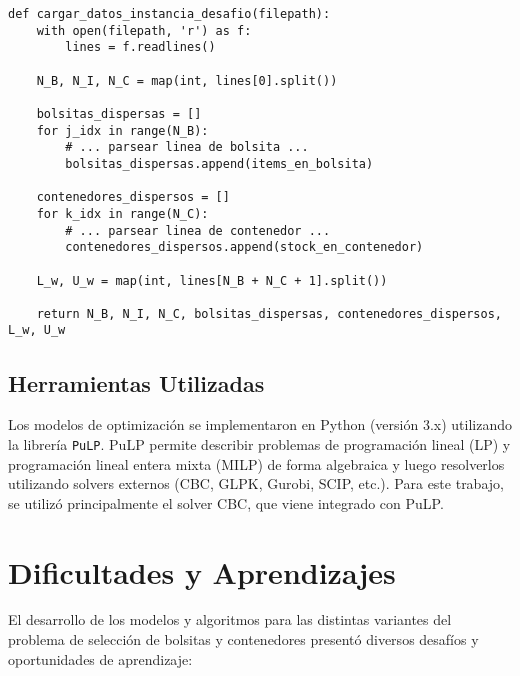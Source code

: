\documentclass[a4paper,12pt]{article}
\begin{document}
\begin{lstlisting}[caption={Función de carga de datos en leer\_archivo.py (Conceptual)}, label={lst:leer_archivo}]
def cargar_datos_instancia_desafio(filepath):
    with open(filepath, 'r') as f:
        lines = f.readlines()
    
    N_B, N_I, N_C = map(int, lines[0].split())
    
    bolsitas_dispersas = []
    for j_idx in range(N_B):
        # ... parsear linea de bolsita ...
        bolsitas_dispersas.append(items_en_bolsita)
        
    contenedores_dispersos = []
    for k_idx in range(N_C):
        # ... parsear linea de contenedor ...
        contenedores_dispersos.append(stock_en_contenedor)
        
    L_w, U_w = map(int, lines[N_B + N_C + 1].split())
    
    return N_B, N_I, N_C, bolsitas_dispersas, contenedores_dispersos, L_w, U_w
\end{lstlisting}

\subsection{Herramientas Utilizadas}
Los modelos de optimización se implementaron en Python (versión 3.x) utilizando la librería \texttt{PuLP}. PuLP permite describir problemas de programación lineal (LP) y programación lineal entera mixta (MILP) de forma algebraica y luego resolverlos utilizando solvers externos (CBC, GLPK, Gurobi, SCIP, etc.). Para este trabajo, se utilizó principalmente el solver CBC, que viene integrado con PuLP.

\section{Dificultades y Aprendizajes}
El desarrollo de los modelos y algoritmos para las distintas variantes del problema de selección de bolsitas y contenedores presentó diversos desafíos y oportunidades de aprendizaje:
\end{document}
